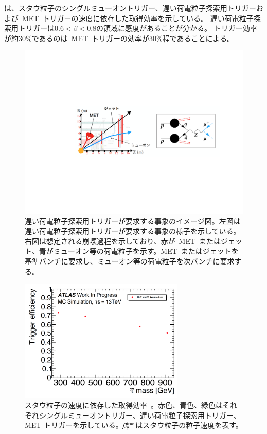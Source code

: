 は、スタウ粒子のシングルミューオントリガー、遅い荷電粒子探索用トリガーおよび~MET~トリガーの速度に依存した取得効率を示している。
遅い荷電粒子探索用トリガーは$0.6 < \beta < 0.8$の領域に感度があることが分かる。
トリガー効率が約$30\%$であるのは~MET~トリガーの効率が$30\%$程であることによる。

\begin{figure}[tbp]
        \centering   
        \includegraphics[width=\textwidth,page=1]{img/pdf3/met.pdf}
        \caption[遅い荷電粒子探索用トリガーが要求する事象のイメージ図]{遅い荷電粒子探索用トリガーが要求する事象のイメージ図。左図は遅い荷電粒子探索用トリガーが要求する事象の様子を示している。右図は想定される崩壊過程を示しており、赤が~MET~またはジェット、青がミューオン等の荷電粒子を示す。MET~またはジェットを基準バンチに要求し、ミューオン等の荷電粒子を次バンチに要求する。}
        \label{fig:met}
\end{figure}

\begin{figure}[tbp]
        \centering   
        \includegraphics[width=0.7\textwidth,page=3]{img/pdf3/sumi.pdf}
        \caption[スタウ粒子の速度に依存した取得効率]{スタウ粒子の速度に依存した取得効率~\cite{MT:01}。赤色、青色、緑色はそれぞれシングルミューオントリガー、遅い荷電粒子探索用トリガー、MET トリガーを示している。$\beta_{\Tilde{\tau}}^{\rm{true}}$はスタウ粒子の粒子速度を表す。}
        \label{fig:sumi3}
\end{figure}


